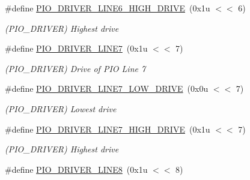 \begin{DoxyCompactItemize}
\mbox{\label{group__SAME70__PIO_ga76cd5c93eebc01ec7840130d1ff47773}} 
\#define \mbox{\hyperlink{group__SAME70__PIO_ga76cd5c93eebc01ec7840130d1ff47773}{P\+I\+O\+\_\+\+D\+R\+I\+V\+E\+R\+\_\+\+L\+I\+N\+E6\+\_\+\+H\+I\+G\+H\+\_\+\+D\+R\+I\+VE}}~(0x1u $<$$<$ 6)
\begin{DoxyCompactList}\small\item\em (P\+I\+O\+\_\+\+D\+R\+I\+V\+ER) Highest drive \end{DoxyCompactList}\item 
\mbox{\label{group__SAME70__PIO_ga8b92274e289f754c152d5fff93f1921f}} 
\#define \mbox{\hyperlink{group__SAME70__PIO_ga8b92274e289f754c152d5fff93f1921f}{P\+I\+O\+\_\+\+D\+R\+I\+V\+E\+R\+\_\+\+L\+I\+N\+E7}}~(0x1u $<$$<$ 7)
\begin{DoxyCompactList}\small\item\em (P\+I\+O\+\_\+\+D\+R\+I\+V\+ER) Drive of P\+IO Line 7 \end{DoxyCompactList}\item 
\mbox{\label{group__SAME70__PIO_ga093c02ecb8fa9199590b087ce7d2eabe}} 
\#define \mbox{\hyperlink{group__SAME70__PIO_ga093c02ecb8fa9199590b087ce7d2eabe}{P\+I\+O\+\_\+\+D\+R\+I\+V\+E\+R\+\_\+\+L\+I\+N\+E7\+\_\+\+L\+O\+W\+\_\+\+D\+R\+I\+VE}}~(0x0u $<$$<$ 7)
\begin{DoxyCompactList}\small\item\em (P\+I\+O\+\_\+\+D\+R\+I\+V\+ER) Lowest drive \end{DoxyCompactList}\item 
\mbox{\label{group__SAME70__PIO_ga90025136b0f5428c0054d88c20fe2830}} 
\#define \mbox{\hyperlink{group__SAME70__PIO_ga90025136b0f5428c0054d88c20fe2830}{P\+I\+O\+\_\+\+D\+R\+I\+V\+E\+R\+\_\+\+L\+I\+N\+E7\+\_\+\+H\+I\+G\+H\+\_\+\+D\+R\+I\+VE}}~(0x1u $<$$<$ 7)
\begin{DoxyCompactList}\small\item\em (P\+I\+O\+\_\+\+D\+R\+I\+V\+ER) Highest drive \end{DoxyCompactList}\item 
\mbox{\label{group__SAME70__PIO_gaa49e8999e47422be5b7195cc5e0c7834}} 
\#define \mbox{\hyperlink{group__SAME70__PIO_gaa49e8999e47422be5b7195cc5e0c7834}{P\+I\+O\+\_\+\+D\+R\+I\+V\+E\+R\+\_\+\+L\+I\+N\+E8}}~(0x1u $<$$<$ 8)
$$
\end{DoxyCompactItemize}
